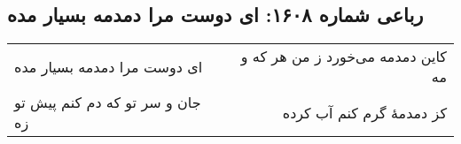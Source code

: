 \begin{center}
\section*{رباعی شماره ۱۶۰۸: ای دوست مرا دمدمه بسیار مده}
\label{sec:1608}
\begin{longtable}{l p{0.5cm} r}
ای دوست مرا دمدمه بسیار مده
&&
کاین دمدمه می‌خورد ز من هر که و مه
\\
جان و سر تو که دم کنم پیش تو زه
&&
کز دمدمهٔ گرم کنم آب کرده
\\
\end{longtable}
\end{center}
